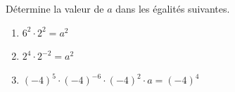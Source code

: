 %
%
  Détermine la valeur de $a$ dans les égalités suivantes.
  \begin{enumerate}
    \item $6^{2} \cdot 2^{2} = a^{2}$
    \item $2^{4} \cdot 2^{- 2} = a^{2}$
    \item $( - 4)^{5} \cdot ( - 4)^{- 6} \cdot ( - 4)^{2} \cdot a = ( - 4)^{4}$
  \end{enumerate}
